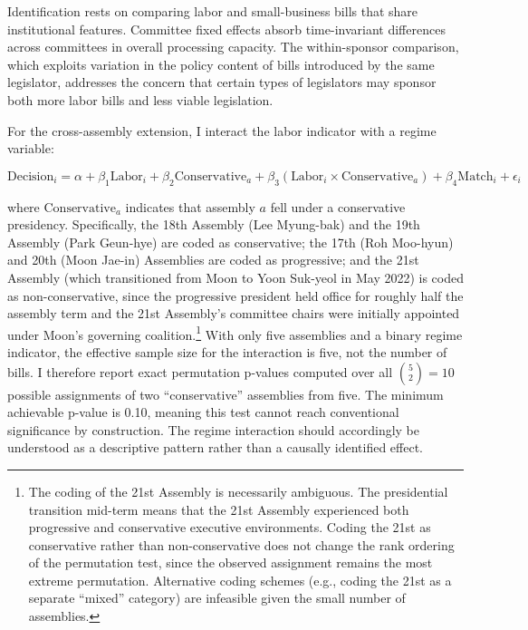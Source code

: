\documentclass[11pt]{article}
\begin{document}
Identification rests on comparing labor and small-business bills that share institutional features. Committee fixed effects absorb time-invariant differences across committees in overall processing capacity. The within-sponsor comparison, which exploits variation in the policy content of bills introduced by the same legislator, addresses the concern that certain types of legislators may sponsor both more labor bills and less viable legislation.

For the cross-assembly extension, I interact the labor indicator with a regime variable:

\begin{equation}
\text{Decision}_i = \alpha + \beta_1 \text{Labor}_i + \beta_2 \text{Conservative}_a + \beta_3 (\text{Labor}_i \times \text{Conservative}_a) + \beta_4 \text{Match}_i + \epsilon_i
\label{eq:regime}
\end{equation}

\noindent where $\text{Conservative}_a$ indicates that assembly $a$ fell under a conservative presidency. Specifically, the 18th Assembly (Lee Myung-bak) and the 19th Assembly (Park Geun-hye) are coded as conservative; the 17th (Roh Moo-hyun) and 20th (Moon Jae-in) Assemblies are coded as progressive; and the 21st Assembly (which transitioned from Moon to Yoon Suk-yeol in May 2022) is coded as non-conservative, since the progressive president held office for roughly half the assembly term and the 21st Assembly's committee chairs were initially appointed under Moon's governing coalition.\footnote{The coding of the 21st Assembly is necessarily ambiguous. The presidential transition mid-term means that the 21st Assembly experienced both progressive and conservative executive environments. Coding the 21st as conservative rather than non-conservative does not change the rank ordering of the permutation test, since the observed assignment remains the most extreme permutation. Alternative coding schemes (e.g., coding the 21st as a separate ``mixed'' category) are infeasible given the small number of assemblies.} With only five assemblies and a binary regime indicator, the effective sample size for the interaction is five, not the number of bills. I therefore report exact permutation p-values computed over all $\binom{5}{2} = 10$ possible assignments of two ``conservative'' assemblies from five. The minimum achievable p-value is 0.10, meaning this test cannot reach conventional significance by construction. The regime interaction should accordingly be understood as a descriptive pattern rather than a causally identified effect.
\end{document}
